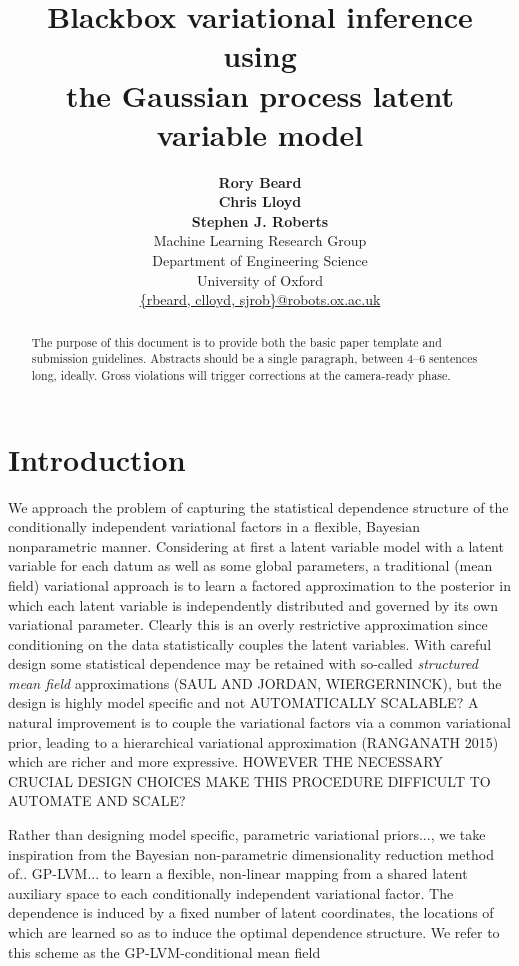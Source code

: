 \documentclass[]{article}
\title{Blackbox variational inference using \\ the Gaussian process latent variable model}
\author{ {\bf Rory Beard} \\
\And
{\bf Chris Lloyd}  \\
\And
{\bf Stephen J. Roberts}   \\
\AND
\textnormal{Machine Learning Research Group} \\
\textnormal{Department of Engineering Science}\\
\textnormal{University of Oxford} \\
\url{{rbeard, clloyd, sjrob}@robots.ox.ac.uk}
}
\begin{document}
\maketitle

\begin{abstract}
The purpose of this document is to provide both the basic paper template and
submission guidelines. Abstracts should be a single paragraph, between 4--6 sentences long, ideally.
Gross violations will trigger corrections at the camera-ready phase.
\end{abstract}

\section{Introduction}\label{sec:intro}

We approach the problem of capturing the statistical dependence structure of the conditionally independent variational factors in a flexible, Bayesian nonparametric manner.
Considering at first a latent variable model with a latent variable for each datum as well as some global parameters, a traditional (mean field) variational approach is to learn a factored approximation to the posterior in which each latent variable is independently distributed and governed by its own variational parameter.
Clearly this is an overly restrictive approximation since conditioning on the data statistically couples the latent variables.
With careful design some statistical dependence may be retained with so-called \emph{structured mean field} approximations (SAUL AND JORDAN, WIERGERNINCK), but the design is highly model specific and not AUTOMATICALLY SCALABLE?
A natural improvement is to couple the variational factors via a common variational prior, leading to a hierarchical variational approximation (RANGANATH 2015) which are richer and more expressive.
HOWEVER THE NECESSARY CRUCIAL DESIGN CHOICES MAKE THIS PROCEDURE DIFFICULT TO AUTOMATE AND SCALE?

Rather than designing model specific, parametric variational priors..., we take inspiration from the Bayesian non-parametric dimensionality reduction method of.. GP-LVM... to learn a flexible, non-linear mapping from a shared latent auxiliary space to each conditionally independent variational factor.
The dependence is induced by a fixed number of latent coordinates, the locations of which are learned so as to induce the optimal dependence structure. We refer to this scheme as the GP-LVM-conditional mean field
\end{document}
